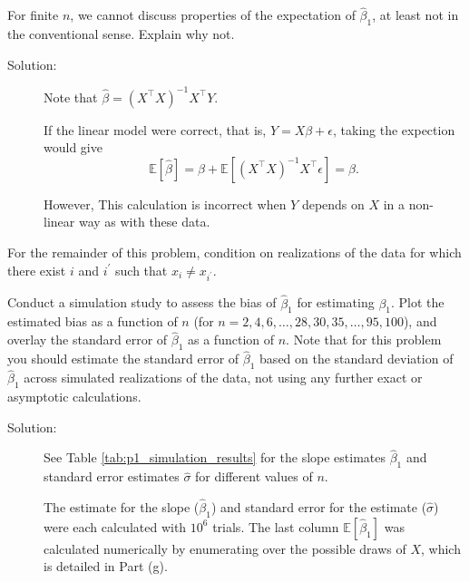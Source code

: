 \documentclass[11pt, letterpaper]{article}
\begin{document}
{\begin{enumerate}[(a)]
{\item For finite $n$, we cannot discuss properties of the expectation of $\hat{\beta}_1$, at least not in the conventional sense.  Explain why not.}

\begin{description}
\item[Solution:] Note that
  $\hat{\beta} = \left(X^\intercal X\right)^{-1} X^\intercal Y$.  

  If the linear model were correct, that is, $Y = X\beta + \epsilon$, taking the
  expection would give
  \begin{equation}
    \mathbb{E}\left[\hat{\beta}\right]
    = \beta + \mathbb{E}\left[
      \left( X^\intercal X \right)^{-1} X^\intercal \epsilon
    \right] = \beta.
  \end{equation}

  However, This calculation is incorrect when $Y$ depends on $X$ in a non-linear
  way as with these data.
\end{description}

\end{enumerate}
For the remainder of this problem, condition on realizations of the data for which there exist $i$ and $i^\prime$ such that $x_i \neq x_{i^\prime}$.
\begin{enumerate}[(a)] \addtocounter{enumi}{4}
{\item Conduct a simulation study to assess the bias of $\hat{\beta}_1$ for estimating $\beta_1$.  Plot the estimated bias as a function of $n$ (for $n=2,4,6,\ldots,28,30,35,\ldots,95,100$), and overlay the standard error of $\hat{\beta}_1$ as a function of $n$.  Note that for this problem you should estimate the standard error of $\hat{\beta}_1$ based on the 
  standard deviation of $\hat{\beta}_1$ across simulated realizations of the data, not using any further exact or asymptotic calculations.}

\begin{description}
\item[Solution:] See Table \ref{tab:p1_simulation_results} for the slope
  estimates $\hat{\beta}_1$ and standard error estimates $\hat{\sigma}$ for
  different values of $n$.

  \begin{table}
    \centering
    
    \caption{The estimate for the slope ($\hat{\beta}_1$) and standard error for
      the estimate ($\hat{\sigma}$) were each calculated with $10^6$ trials. The
      last column $\mathbb{E}\left[\hat{\beta}_1\right]$ was calculated
      numerically by enumerating over the possible draws of $X$, which is detailed in Part (g).}
    \label{tab:p1_simulation_results}
  \end{table}


\end{description}
\end{enumerate}}
\end{document}
